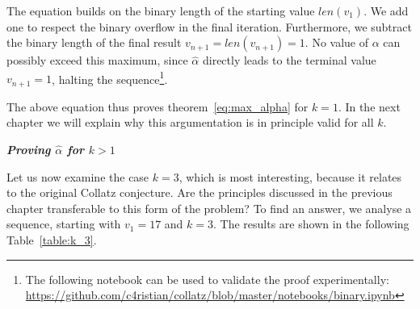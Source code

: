 \documentclass{SciPress_2015}
\renewcommand{\subsection}[1]{\textit{\textbf{#1}}}
\begin{document}
The equation builds on the binary length of the starting value $len(v_1)$. We add one to respect the binary overflow in the final iteration. Furthermore, we subtract the binary length of the final result $v_{n+1}=len(v_{n+1})=1$. No value of $\alpha$ can possibly exceed this maximum, since $\hat\alpha$ directly leads to the terminal value $v_{n+1}=1$, halting the sequence\footnote{The following notebook can be used to validate the proof experimentally:\\ \hspace*{7mm}\url{https://github.com/c4ristian/collatz/blob/master/notebooks/binary.ipynb}}.

\newpage
\par\noindent
The above equation thus proves theorem~\ref{eq:max_alpha} for $k=1$. In the next chapter we will explain why this argumentation is in principle valid for all $k$.

\vspace{1em}\noindent
\subsection{Proving \boldmath$\hat\alpha$ for \boldmath$k>1$}
\par\noindent
Let us now examine the case $k=3$, which is most interesting, because it relates to the original Collatz conjecture. Are the principles discussed in the previous chapter transferable to this form of the problem? To find an answer, we analyse a sequence, starting with $v_1=17$ and $k=3$. The results are shown in the following Table~\ref{table:k_3}.
\end{document}
